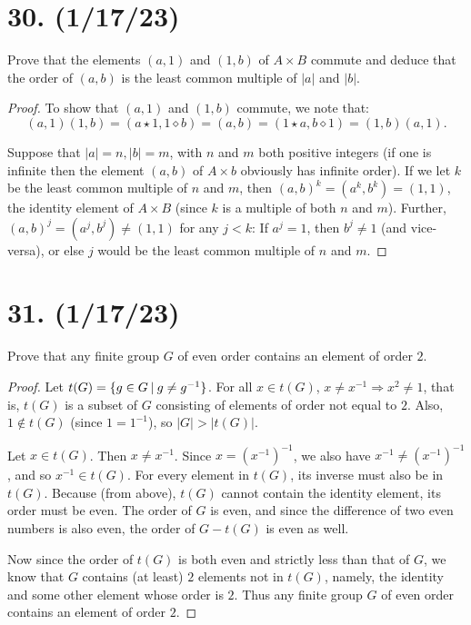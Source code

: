 \documentclass{article}
\begin{document}
\section*{30. (1/17/23)}

Prove that the elements $(a, 1)$ and $(1, b)$ of $A \times B$ commute and deduce that the order of $(a, b)$ is the least common multiple of $|a|$ and $|b|$.

\begin{proof}
      To show that $(a, 1)$ and $(1, b)$ commute, we note that:
      \begin{equation*}
            (a, 1)(1, b) = (a \star 1, 1 \diamond b) = (a, b) = (1 \star a, b \diamond 1) = (1, b)(a, 1).
      \end{equation*}

      Suppose that $|a| = n, |b| = m$, with $n$ and $m$ both positive integers (if one is infinite then the element $(a, b)$ of $A \times b$ obviously has infinite order). If we let $k$ be the least common multiple of $n$ and $m$, then $(a, b)^k = (a^k, b^k) = (1, 1)$, the identity element of $A \times B$ (since $k$ is a multiple of both $n$ and $m$). Further, $(a, b)^j = (a^j, b^j) \neq (1,1)$ for any $j < k$: If $a^j = 1$, then $b^j \neq 1$ (and vice- versa), or else $j$ would be the least common multiple of $n$ and $m$.
\end{proof}

\section*{31. (1/17/23)}

Prove that any finite group $G$ of even order contains an element of order $2$.

\begin{proof}
      Let $t(G) = \{g \in G\hspace{0.5ex}|\hspace{0.5ex}g \neq g^{-1}\}$. For all $x \in t(G)$, $x \neq x^{-1} \Rightarrow x^2 \neq 1$, that is, $t(G)$ is a subset of $G$ consisting of elements of order not equal to $2$. Also, $1 \notin t(G)$ (since $1 = 1^{-1}$), so $|G| > |t(G)|$.
      
      Let $x \in t(G)$. Then $x \neq x^{-1}$. Since $x = (x^{-1})^{-1}$, we also have $x^{-1} \neq (x^{-1})^{-1}$, and so $x^{-1} \in t(G)$. For every element in $t(G)$, its inverse must also be in $t(G)$. Because (from above), $t(G)$ cannot contain the identity element, its order must be even. The order of $G$ is even, and since the difference of two even numbers is also even, the order of $G - t(G)$ is even as well.

      Now since the order of $t(G)$ is both even and strictly less than that of $G$, we know that $G$ contains (at least) $2$ elements not in $t(G)$, namely, the identity and some other element whose order is $2$. Thus any finite group $G$ of even order contains an element of order $2$.
\end{proof}
\end{document}
